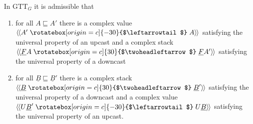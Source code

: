 \documentclass[acmsmall,nonacm]{acmart}
\renewcommand{\u}{\underline}
\newcommand{\ltdyn}{\sqsubseteq}
\newcommand{\uarrow}{\mathrel{\rotatebox[origin=c]{-30}{$\leftarrowtail$}}}
\newcommand{\darrow}{\mathrel{\rotatebox[origin=c]{30}{$\twoheadleftarrow$}}}
\newcommand{\defupcast}[2]{\langle\kern-1ex~\langle{#2}\uarrow{#1}\rangle\kern-1ex~\rangle}
\newcommand{\defdncast}[2]{\langle\kern-1ex~\langle{#1}\darrow{#2}\rangle\kern-1ex~\rangle}
\begin{document}
\begin{lemma} \label{lem:casts-admissible}
In GTT$_G$ it is admissible that
\begin{enumerate}
\item for all $A \ltdyn A'$
  there is a complex value $\defupcast{A}{A'}$
  satisfying the universal property of an upcast
  and a complex stack $\defdncast{\u F A}{\u F A'}$
  satisfying the universal property of a downcast
\item for all $\u B \ltdyn \u B'$ there is a complex
  stack $\defdncast{\u B}{\u B'}$ satisfying the universal property of a
  downcast and a complex value $\defupcast{U \u B}{U \u B'}$ satisfying
  the universal property of an upcast.
\end{enumerate}
\end{lemma}
\end{document}
